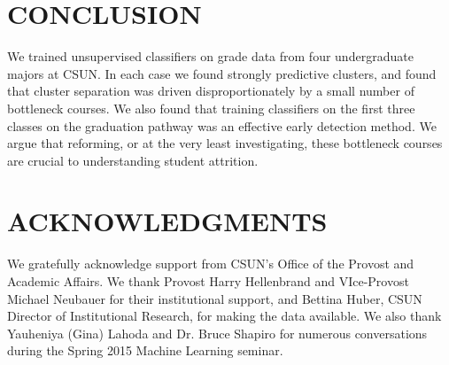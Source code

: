 \documentclass{sigchi}
\begin{document}
\section{CONCLUSION}

We trained unsupervised classifiers on grade data from four undergraduate majors at CSUN. In each case we found strongly predictive clusters, and found that cluster separation was driven disproportionately by a small number of bottleneck courses. We also found that training classifiers on the first three classes on the graduation pathway was an effective early detection method. We argue that reforming, or at the very least investigating, these bottleneck courses are crucial to understanding student attrition.



\section{ACKNOWLEDGMENTS}

We gratefully acknowledge support from CSUN’s Office of the Provost and Academic Affairs. We thank Provost Harry Hellenbrand and VIce-Provost Michael Neubauer for their institutional support, and Bettina Huber, CSUN Director of Institutional Research, for making the data available. We also thank Yauheniya (Gina) Lahoda and Dr. Bruce Shapiro for numerous conversations during the Spring 2015 Machine Learning seminar. 

\balance{}


\end{document}
